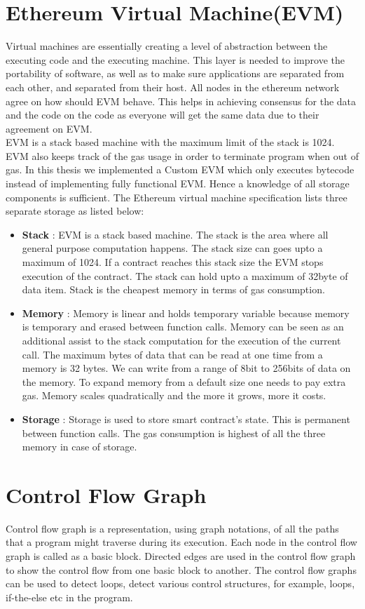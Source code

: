 \section{Ethereum Virtual Machine(EVM)}
Virtual machines are essentially creating a level of abstraction between the executing code and the executing machine. This layer is needed to improve the portability of software, as well as to make sure applications are separated from each other, and separated from their host. All nodes in the ethereum network agree on how should EVM behave. This helps in achieving consensus for the data and the code on the code as everyone will get the same data due to their agreement on EVM\cite{whatisEVM}.\\
EVM is a stack based machine with the maximum limit of the stack is 1024. EVM also keeps track of the gas usage in order to terminate program when out of gas. In this thesis we implemented a Custom EVM which only executes bytecode instead of implementing fully functional EVM. Hence a knowledge of all storage components is sufficient. The Ethereum virtual machine specification lists three separate storage\cite{bitdegree} as listed below:
\begin{itemize}
    \item \textbf{Stack} : EVM is a stack based machine. The stack is the area where all general purpose computation happens. The stack size can goes upto a maximum of 1024. If a contract reaches this stack size the EVM stops execution of the contract. The stack can hold upto a maximum of 32byte of data item. Stack is the cheapest memory in terms of gas consumption.
    \item \textbf{Memory} : Memory is linear and holds temporary variable because memory is temporary and erased between function calls. Memory can be seen as an additional assist to the stack computation for the execution of the current call. The maximum bytes of data that can be read at one time from a memory is 32 bytes. We can write from a range of 8bit to 256bits of data on the memory. To expand memory from a default size one needs to pay extra gas. Memory scales quadratically and the more it grows, more it costs. 
    \item \textbf{Storage} : Storage is used to store smart contract's state. This is permanent between function calls. The gas consumption is highest of all the three memory in case of storage.
\end{itemize}
\section{Control Flow Graph}
Control flow graph is a representation, using graph notations, of all the paths that a program might traverse during its execution\cite{controlflow}. Each node in the control flow graph is called as a basic block. Directed edges are used in the control flow graph to show the control flow from one basic block to another. The control flow graphs can be used to detect loops, detect various control structures, for example, loops, if-the-else etc in the program. 
